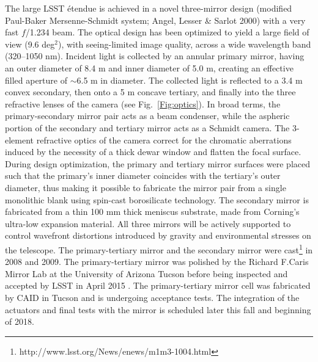 The large LSST \'etendue is achieved in a novel three-mirror design (modified
Paul-Baker Mersenne-Schmidt system; Angel, Lesser \& Sarlot 2000) with a very fast $f$/1.234 beam. The optical
design has been optimized to yield a large field of view (9.6 deg$^2$),
with seeing-limited image quality, across a wide wavelength band (320--1050
nm). Incident light is collected by an annular primary mirror, having
an outer diameter of 8.4 m and inner diameter of 5.0 m, creating an effective filled aperture of
$\sim$6.5 m in diameter. The collected light is reflected to a 3.4 m convex secondary, then onto
a 5 m concave tertiary, and finally  into the three refractive lenses of the camera (see Fig.~\ref{Fig:optics}).
In broad terms, the primary-secondary mirror pair acts as a beam condenser, while the aspheric portion of
the secondary and tertiary mirror acts as a Schmidt camera.  The 3-element refractive optics of the camera
correct for the chromatic aberrations induced by the necessity of a thick dewar window and flatten the
focal surface.  During design optimization, the primary and tertiary mirror surfaces were placed such that the primary's
inner diameter coincides with the tertiary's outer diameter, thus making it possible to fabricate the mirror pair from a
single monolithic blank using spin-cast borosilicate technology. The secondary mirror is fabricated from
a thin 100 mm thick meniscus substrate, made from Corning's ultra-low expansion material. All
three mirrors will be actively supported to control wavefront distortions
introduced by gravity and environmental stresses on the telescope.
The primary-tertiary mirror and the secondary mirror were
cast\footnote{http://www.lsst.org/News/enews/m1m3-1004.html}  in 2008
and 2009.  The primary-tertiary mirror was polished by the Richard F.Caris Mirror Lab at the University of Arizona Tucson before being inspected and accepted by LSST in April 2015 \cite{Araujo16}. The  primary-tertiary mirror cell was fabricated by CAID in Tucson and is undergoing acceptance tests. The integration of the actuators and final tests with the mirror is scheduled later this fall and beginning of 2018.

